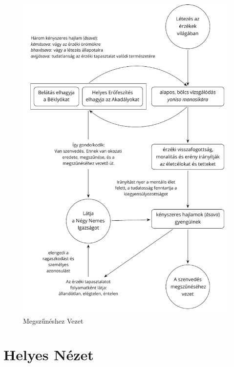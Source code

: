 \clearpage

\begin{figure}[h]
\vspace*{-10mm}%
\caption{Megszűnéshez Vezet}\label{fig-leading-to-cessation}

\centering

\includegraphics[width=\linewidth-5mm]{./manuscript/tex/diagrams/leading-to-cessation-hu.pdf}

\end{figure}

\clearpage
\normalpagelayout

\section{Helyes Nézet}

